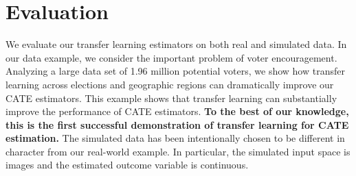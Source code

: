 


\section{Evaluation} \label{section:Simulation}
We evaluate our transfer learning estimators on both real and simulated data.  In our data example, we consider the important problem of voter encouragement. Analyzing a large data set of 1.96 million potential voters, we show how transfer learning across elections and geographic regions can dramatically improve our CATE estimators. This example shows that transfer learning can substantially improve the performance of CATE estimators. \textbf{To the best of our knowledge, this is the first successful demonstration of transfer learning for CATE estimation.} The simulated data has been intentionally chosen to be different in character from our real-world example. In particular, the simulated input space is images and the estimated outcome variable is continuous. %


